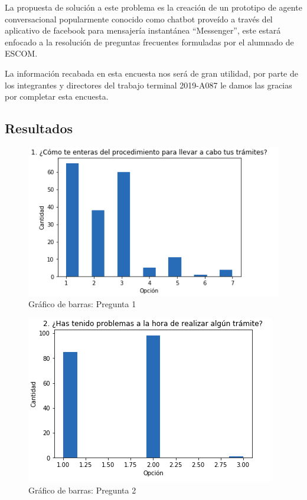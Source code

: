         La propuesta de solución a este problema es la creación de un prototipo de agente conversacional popularmente conocido como chatbot proveído a través del aplicativo de facebook para mensajería instantánea “Messenger”, este estará enfocado a la resolución de preguntas frecuentes formuladas por el alumnado de ESCOM.
        
        
        La información recabada en esta encuesta nos será de gran utilidad, por parte de los integrantes y directores del trabajo terminal 2019-A087 le damos las gracias por completar esta encuesta.
    
        \subsection{Resultados}
            \begin{figure}[H]
                \centering
                \includegraphics[width=.8\linewidth]{Latex/Classes/Imagenes/1.png}
                \caption{Gráfico de barras: Pregunta 1}
            \end{figure}
            \begin{figure}[H]
                \centering
                \includegraphics[width=.8\linewidth]{Latex/Classes/Imagenes/2.png}
                \caption{Gráfico de barras: Pregunta 2}
            \end{figure}
